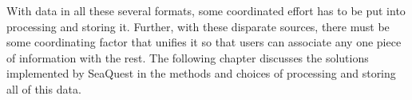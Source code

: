 With data in all these several formats, some coordinated effort has to be put into processing and storing it. Further, with these disparate sources, there must be some coordinating factor that unifies it so that users can associate any one piece of information with the rest. The following chapter discusses the solutions implemented by SeaQuest in the methods and choices of processing and storing all of this data.